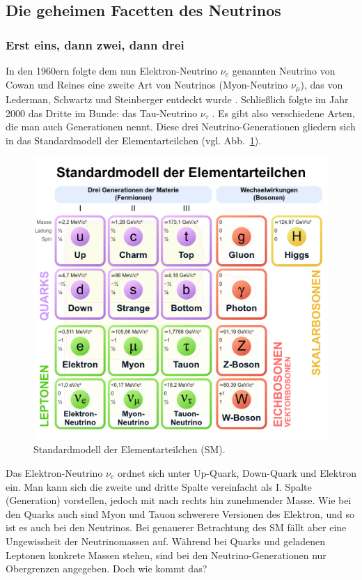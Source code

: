 \documentclass[a4paper,12pt]{article}
\newcommand{\figref}[1]{Abb.~\ref{#1}}
\begin{document}
\subsection{Die geheimen Facetten des Neutrinos} \label{ssec:22}
\subsubsection{Erst eins, dann zwei, dann drei} \label{sssec:221}
In den 1960ern folgte dem nun Elektron-Neutrino $\nu_e$ genannten Neutrino von Cowan und Reines eine zweite Art von Neutrinos (Myon-Neutrino $\nu_\mu$), das von Lederman, Schwartz und Steinberger entdeckt wurde \cite{NPOd}. Schließlich folgte im Jahr 2000 das Dritte im Bunde: das Tau-Neutrino $\nu_\tau$ \cite{Fermilab} \cite[1--2]{DONUT2001}. Es gibt also verschiedene Arten, die man auch Generationen nennt. Diese drei Neutrino-Generationen gliedern sich in das Standardmodell der Elementarteilchen (vgl. \figref{fig:sm}). 
\begin{figure}[b!]
\includegraphics[width=1\textwidth]{Standard_Model_of_Elementary_Particles-de}
\caption[Standardmodell der Elementarteilchen (SM). -- Quelle: Cush via Wikimedia Commons: {\url{https://commons.wikimedia.org/wiki/File:Standard_Model_of_Elementary_Particles-de.svg}} \ (besucht am 31.05.2025).]{Standardmodell der Elementarteilchen (SM).}
\label{fig:sm}
\end{figure}Das Elektron-Neutrino $\nu_e$ ordnet sich unter Up-Quark, Down-Quark und Elektron ein. Man kann sich die zweite und dritte Spalte vereinfacht als \RN{1}. Spalte (Generation) vorstellen, jedoch mit nach rechts hin zunehmender Masse. Wie bei den Quarks auch sind Myon und Tauon schwerere Versionen des Elektron, und so ist es auch bei den Neutrinos. Bei genauerer Betrachtung des SM fällt aber eine Ungewissheit der Neutrinomassen auf. Während bei Quarks und geladenen Leptonen konkrete Massen stehen, sind bei den Neutrino-Generationen nur  Obergrenzen angegeben. Doch wie kommt das? \par
\end{document}
